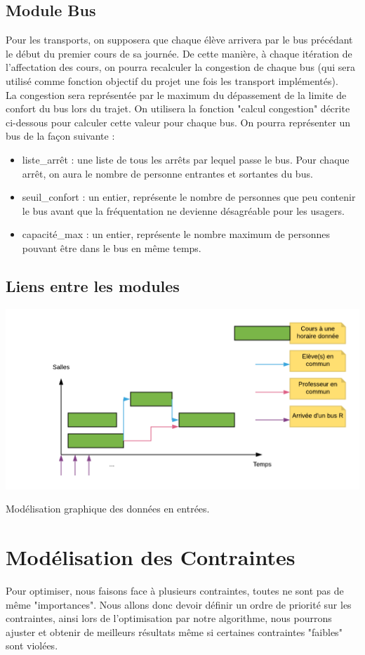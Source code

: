 \documentclass[a4paper,11pt]{article}
\begin{document}
	\subsection{Module Bus}
		Pour les transports, on supposera que chaque élève arrivera par le bus précédant le début du premier cours de sa journée. De cette manière, à chaque itération de l'affectation des cours, on pourra recalculer la congestion de chaque bus (qui sera utilisé comme fonction objectif du projet une fois les transport implémentés).\\
		La congestion sera représentée par le maximum du dépassement de la limite de confort du bus lors du trajet. On utilisera la fonction "calcul congestion" décrite ci-dessous pour calculer cette valeur pour chaque bus. On pourra représenter un bus de la façon suivante :
		\begin{itemize}
			\item liste\_arrêt : une liste de tous les arrêts par lequel passe le bus. Pour chaque arrêt, on aura le nombre de personne entrantes et sortantes du bus.
			\item seuil\_confort : un entier, représente le nombre de personnes que peu contenir le bus avant que la fréquentation ne devienne désagréable pour les usagers.
			\item capacité\_max : un entier, représente le nombre maximum de personnes pouvant être dans le bus en même temps.
		\end{itemize}

	\subsection{Liens entre les modules}
		\centerline{\includegraphics[scale=0.5]{modelter.png}}
		Modélisation graphique des données en entrées.\\

\section{Modélisation des Contraintes}
	Pour optimiser, nous faisons face à plusieurs contraintes, toutes ne sont pas 
	de même "importances". Nous allons donc devoir définir un ordre de priorité sur 
	les contraintes, ainsi lors de l'optimisation par notre algorithme, nous 
	pourrons ajuster et obtenir de meilleurs résultats même si certaines contraintes
	"faibles" sont violées.\\
\end{document}
